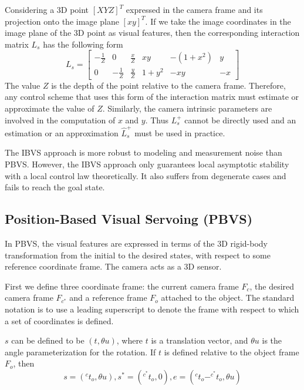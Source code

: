  Considering a 3D point $[X Y Z]^{T}$ expressed in the camera frame and its projection onto the image plane $[x y]^{T}$. If we take the image coordinates in the image plane of the 3D point as visual features, then the corresponding interaction matrix $L_s$ has the following form
 \begin{equation}
L_s = \begin{bmatrix}
  -\frac{1}{Z} & 0 & \frac{x}{Z} & xy & -(1+x^2) & y\\
  0 & -\frac{1}{Z} & \frac{y}{Z} & 1+y^2 & -xy & -x
\end{bmatrix}
\label{eq:servo5}
 \end{equation}
 The value $Z$ is the depth of the point relative to the camera frame. Therefore, any control scheme that uses this form of the interaction matrix must estimate or approximate the value of $Z$. Similarly, the camera intrinsic parameters are involved in the computation of $x$ and $y$. Thus $L_{s}^{+}$ cannot be directly used and an estimation or an approximation $\widehat{L}_s^{+}$ must be used in practice.

The IBVS approach is more robust to modeling and measurement noise than PBVS. However, the IBVS approach only guarantees local asymptotic stability with a local control law theoretically. It also suffers from degenerate cases and fails to reach the goal state.

\subsection{Position-Based Visual Servoing (PBVS)}
In PBVS, the visual features are expressed in terms of the 3D rigid-body transformation from the initial to the desired states, with respect to some reference coordinate frame. The camera acts as a 3D sensor.

First we define three coordinate frame: the current camera frame $F_c$, the desired camera frame $F_{c^*}$ and a reference frame $F_o$ attached to the object. The standard notation is to use a leading superscript to denote the frame with respect to which a set of coordinates is defined.

$s$ can be defined to be $(t,\theta u)$, where $t$ is a translation vector, and $\theta u$ is the angle parameterization for the rotation. If $t$ is defined relative to the object frame $F_o$, then
\begin{equation}
s = (^{c}t_o,\theta u), s^* = (^{c^*}t_o, 0), e = (^{c}t_o - ^{c^*}t_o, \theta u)
\label{eq:servo6}
\end{equation}

